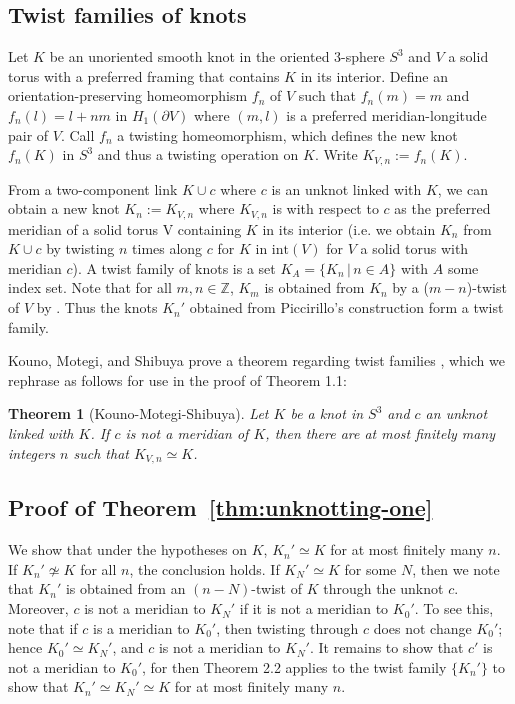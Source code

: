 \documentclass[11pt,usenames,dvipsnames,reqno]{amsart}
\newtheorem{theorem}{Theorem}
\numberwithin{theorem}{section}
\theoremstyle{ex}
\theoremstyle{rem}
\begin{document}
\subsection{Twist families of knots}

Let $K$ be an unoriented smooth knot in the oriented 3-sphere $S^3$ and $V$ a solid torus with a preferred framing that contains $K$ in its interior. Define an orientation-preserving homeomorphism $f_n$ of $V$ such that $f_n(m)=m$ and  $f_n(l)=l+nm$ in $H_1(\partial V)$ where $(m, l)$ is a preferred meridian-longitude pair of $V$. Call $f_n$ a twisting homeomorphism, which defines the new knot $f_n(K)$ in $S^3$ and thus a twisting operation on $K$. Write $K_{V,n} := f_n(K)$.

From a two-component link $K\cup c$ where $c$ is an unknot linked with $K$, we can obtain a new knot $K_n := K_{V,n}$ where $K_{V,n}$ is with respect to $c$ as the preferred meridian of a solid torus V containing $K$ in its interior (i.e. we obtain $K_n$ from $K\cup c$ by twisting $n$ times along $c$ for $K$ in $\mathrm{int}(V)$ for $V$ a solid torus with meridian $c$). A twist family of knots is a set $K_A=\{K_n \,|\, n \in A\}$ with $A$ some index set. Note that for all $m, n\in\mathbb{Z}$,  $K_m$ is obtained from $K_n$ by a ($m-n$)-twist of $V$ by \cite[Remark 2.2]{twisting-knot-types}. Thus the knots $K_n'$ obtained from Piccirillo's construction form a twist family. 

Kouno, Motegi, and Shibuya prove a theorem regarding twist families \cite[Theorem 3.2]{twisting-knot-types}, which we rephrase as follows for use in the proof of Theorem 1.1:

\begin{theorem}[Kouno-Motegi-Shibuya] Let $K$ be a knot in $S^3$ and $c$ an unknot linked with $K$. If $c$ is not a meridian of $K$, then there are at most finitely many integers $n$ such that $K_{V,n}\simeq K$. 
\end{theorem}

\subsection{Proof of Theorem~\ref{thm:unknotting-one}} We show that under the hypotheses on $K$, $K_n'\simeq K$ for at most finitely many $n$. If $K_n'\not\simeq K$ for all $n$, the conclusion holds. If $K_N'\simeq K$ for some $N$, then we note that $K_n'$ is obtained from an $(n-N)$-twist of $K$ through the unknot $c$. Moreover, $c$ is not a meridian to $K_N'$ if it is not a meridian to $K_0'$. To see this, note that if $c$ is a meridian to $K_0'$, then twisting through $c$ does not change $K_0'$; hence $K_0'\simeq K_N'$, and $c$ is not a meridian to $K_N'$. It remains to show that $c'$ is not a meridian to $K_0'$, for then Theorem 2.2 applies to the twist family $\{K_n'\}$ to show that $K_n'\simeq K_N'\simeq K$ for at most finitely many $n$. 
\end{document}
